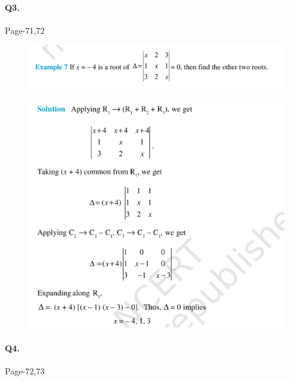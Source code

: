 \documentclass{article}
\begin{document}
\paragraph{Q3.}
\begin{flushright}
Page-71,72
\end{flushright}

\begin{figure}[H]
    \includegraphics[scale=0.5]{determinants_l2_ps_31.png}
\end{figure}
\begin{figure}[H]
    \includegraphics[scale=0.5]{determinants_l2_ps_32.png}
\end{figure}
\paragraph{Q4.}
\begin{flushright}
Page-72,73
\end{flushright}
\end{document}
